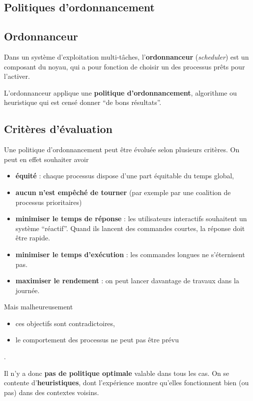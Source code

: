 \begin{multicols}{2}
\section{Politiques d'ordonnancement}

\subsection{Ordonnanceur}

Dans un système d'exploitation multi-tâches, l'\textbf{ordonnanceur} (\emph{scheduler})
est un composant du noyau, qui a pour fonction de choisir un des processus prêts pour l'activer.

L'ordonnanceur applique une \textbf{politique d'ordonnancement}, algorithme ou heuristique qui est censé donner ``de bons résultats''.

\subsection{Critères d'évaluation}

Une politique d'ordonnancement peut être évoluée selon plusieurs critères. On peut en effet souhaiter avoir
\begin{itemize}
\item \textbf{équité}  : chaque processus dispose d'une part équitable 
du temps global, 
\item \textbf{aucun n'est empêché de tourner} (par exemple par une coalition de processus
prioritaires)
\item \textbf{minimiser le temps de réponse}  : les utilisateurs interactifs souhaitent un système ``réactif''. Quand ils lancent des commandes courtes, la réponse doit être rapide.
\item \textbf{minimiser le temps d'exécution} : les commandes longues ne s'éternisent pas.
\item \textbf{maximiser le rendement} : on peut lancer davantage de travaux dans la journée.
\end{itemize}

Mais malheureusement
\begin{itemize}
\item ces objectifs sont contradictoires,
\item le comportement des processus ne peut pas être prévu
\end{itemize}.

Il n'y a donc \textbf{pas de politique optimale} valable dans tous les cas.
On se contente d'\textbf{heuristiques}, dont l'expérience montre qu'elles fonctionnent bien
(ou pas) dans des contextes voisins. 


\end{multicols}
